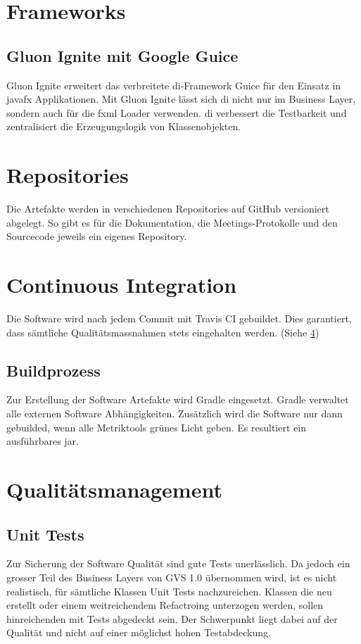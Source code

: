 \documentclass[11pt,a4paper,english,oneside]{book}
\numberwithin{equation}{chapter}
\begin{document}
	\section{Frameworks}
	
	\subsection{Gluon Ignite mit Google Guice}
	Gluon Ignite \cite{gluonignite} erweitert das verbreitete \gls{di}-Framework Guice \cite{guice} für den Einsatz in \gls{javafx} Applikationen. Mit Gluon Ignite lässt sich \gls{di} nicht nur im Business Layer, sondern auch für die \gls{fxml} Loader verwenden. \gls{di} verbessert die Testbarkeit und zentralisiert die Erzeugungslogik von Klassenobjekten.

	\section{Repositories}
	Die Artefakte werden in verschiedenen Repositories auf GitHub versioniert abgelegt. So gibt es für die Dokumentation, die Meetings-Protokolle und den Sourcecode jeweils ein eigenes Repository.

	\section{Continuous Integration}
	Die Software wird nach jedem Commit mit Travis CI \cite{travisci} gebuildet. Dies garantiert, dass sämtliche Qualitätsmassnahmen stets eingehalten werden. (Siehe \ref{sec:qualitymeasures})
	
	\subsection{Buildprozess}
	\label{sec:buildprocess}
	Zur Erstellung der Software Artefakte wird Gradle \cite{gradle} eingesetzt. Gradle verwaltet alle externen Software Abhängigkeiten. Zusätzlich wird die Software nur dann gebuilded, wenn alle Metriktools grünes Licht geben. Es resultiert ein ausführbares \gls{jar}.
		
	\section{Qualitätsmanagement}
	\label{sec:qualitymeasures}
	
	\subsection{Unit Tests}
	Zur Sicherung der Software Qualität sind gute Tests unerlässlich. Da jedoch ein grosser Teil des Business Layers von GVS 1.0 übernommen wird, ist es nicht realistisch, für sämtliche Klassen Unit Tests nachzureichen. Klassen die neu erstellt oder einem weitreichendem Refactroing unterzogen werden, sollen hinreichenden mit Tests abgedeckt sein. Der Schwerpunkt liegt dabei auf der Qualität und nicht auf einer möglichst hohen Testabdeckung.
	
\end{document}
